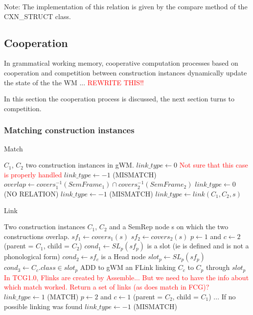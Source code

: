 \documentclass{article}
\newcommand\todo[1]{\textcolor{red}{#1}}
\begin{document}
Note: The implementation of this relation is given by the compare method of the CXN\_STRUCT class.

\subsection{Cooperation}

In grammatical working memory, cooperative computation  processes based on cooperation and competition between construction instances dynamically update the state of the the WM ... \todo{REWRITE THIS!!}

In this section the cooperation process is discussed, the next section turns to competition.

\subsubsection{Matching construction instances}

\begin{algorithm}[H]
\caption{Match}
\label{match}
\begin{algorithmic}
	\REQUIRE $C_1$, $C_2$ two construction instances in gWM.
	\STATE $link\_type \leftarrow 0$
		\STATE \todo{Not sure that this case is properly handled}
		\RETURN $link\_type \leftarrow -1$ (MISMATCH)
	\ELSE
		\STATE $overlap \leftarrow covers_1^{-1}(SemFrame_1) \cap  covers_2^{-1}(SemFrame_2)$
			\RETURN $link\_type \leftarrow 0$ (NO RELATION)
		\ELSE
					\RETURN $link\_type \leftarrow -1$ (MISMATCH)
				\ELSE
					\RETURN $link\_type \leftarrow link(C_1,C_2,s)$
				\ENDIF
			\ENDFOR
		\ENDIF
	\ENDIF
\end{algorithmic}
\end{algorithm}

\begin{algorithm}[H]
\caption{Link}
\label{link}
\begin{algorithmic}
	\REQUIRE Two construction instances $C_1$, $C_2$ and a SemRep node s on which the two constructions overlap.
	\STATE $sf_1 \leftarrow covers_1(s)$
	\STATE $sf_2 \leftarrow covers_2(s)$
	\STATE $p \leftarrow 1$ and $c \leftarrow 2$ (parent = $C_1$, child = $C_2$)
	\STATE $cond_1 \leftarrow SL_p(sf_p)$ is a slot (ie is defined and is not a phonological form)
	\STATE $cond_2 \leftarrow sf_c$ is a Head node
		\STATE $slot_p \leftarrow SL_p(sf_p)$
		\STATE $cond_3 \leftarrow C_c.class \in slot_p$
			\STATE ADD to gWM an FLink linking $C_c$ to $C_p$ through $slot_p$
			\STATE \todo{In TCG1.0, Flinks are created by Assemble...}
			\STATE \todo{But we need to have the info about which match worked. Return a set of links (as does match in FCG)?}
			\RETURN $link\_type \leftarrow 1$ (MATCH)
		\ENDIF
	\ENDIF
	\STATE $p \leftarrow 2$ and $c \leftarrow 1$ (parent = $C_2$, child = $C_1$)
	\STATE ...
	\STATE If no possible linking was found
	\RETURN $link\_type \leftarrow -1$ (MISMATCH)
\end{algorithmic}	
\end{algorithm}
\end{document}
